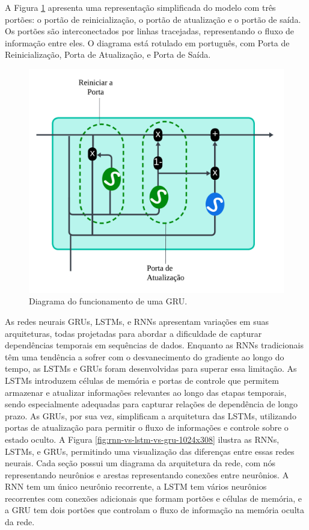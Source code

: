  A Figura \ref{fig:gru} apresenta uma representação simplificada do modelo com três portões: o portão de reinicialização, o portão de atualização e o portão de saída. Os portões são interconectados por linhas tracejadas, representando o fluxo de informação entre eles. O diagrama está rotulado em português, com Porta de Reinicialização, Porta de Atualização, e Porta de Saída\cite{Saranya2020, Jordan2021, Khan2022}.
 
 \begin{figure}[!htb]
 \centering
 \caption{Diagrama do funcionamento de uma GRU.}
 \label{fig:gru}
 \includegraphics[width=0.5\linewidth]{Modelos/Figuras/gru.pdf}
\end{figure}
 
 As redes neurais GRUs, LSTMs, e RNNs apresentam variações em suas arquiteturas, todas projetadas para abordar a dificuldade de capturar dependências temporais em sequências de dados. Enquanto as RNNs tradicionais têm uma tendência a sofrer com o desvanecimento do gradiente ao longo do tempo, as LSTMs e GRUs foram desenvolvidas para superar essa limitação. As LSTMs introduzem células de memória e portas de controle que permitem armazenar e atualizar informações relevantes ao longo das etapas temporais, sendo especialmente adequadas para capturar relações de dependência de longo prazo. As GRUs, por sua vez, simplificam a arquitetura das LSTMs, utilizando portas de atualização para permitir o fluxo de informações e controle sobre o estado oculto.
 A Figura \ref{fig:rnn-vs-lstm-vs-gru-1024x308} ilustra as RNNs, LSTMs, e GRUs, permitindo uma visualização das diferenças entre essas redes neurais. Cada seção possui um diagrama da arquitetura da rede, com nós representando neurônios e arestas representando conexões entre neurônios. A RNN tem um único neurônio recorrente, a LSTM tem vários neurônios recorrentes com conexões adicionais que formam portões e células de memória, e a GRU tem dois portões que controlam o fluxo de informação na memória oculta da rede. 
 
